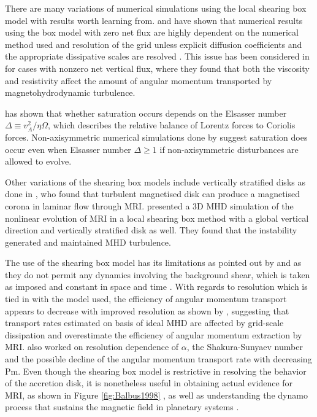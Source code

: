 \documentclass{jfm}
\begin{document}
There are many variations of numerical simulations using the local shearing box
model with results worth learning from. \cite{Fromang&Papaloizou2007} and
\cite{Fromang2007} have shown that numerical results using the box model with
zero net flux are highly dependent on the numerical method used and resolution
of the grid unless explicit diffusion coefficients and the appropriate
dissipative scales are resolved . This issue has been considered in
\cite{Lesur2007} for cases with nonzero net vertical flux, where they found
that both the viscosity and resistivity affect the amount of angular momentum
transported by magnetohydrodynamic turbulence. 

\cite{Sano1998} has shown that whether saturation occurs depends on the
Elsasser number $\Delta \equiv v^2_A/\eta \Omega$, which describes the relative
balance of Lorentz forces to Coriolis forces. Non-axisymmetric numerical
simulations done by \cite{Fleming2000} suggest saturation does occur even when
Elsasser number $  \Delta \ge 1$ if non-axisymmetric disturbances are allowed
to evolve. 

Other variations of the shearing box models include vertically stratified disks
as done in \cite{Miller1999}, who found that turbulent magnetised disk can
produce a magnetised corona in laminar flow through MRI. \cite{Stone1996}
presented a 3D MHD simulation of the nonlinear evolution of MRI in a local
shearing box method with a global vertical direction and vertically stratified
disk as well. They found that the instability generated and maintained MHD
turbulence.

The use of the shearing box model has its limitations as pointed out by
\cite{Hawley1995} and \cite{Regev2008} as they do not permit any dynamics
involving the background shear, which is taken as imposed and constant in space
and time \citep{Regev2008}. With regards to resolution which is tied in with
the model used, the efficiency of angular momentum transport appears to
decrease with improved resolution as shown by \cite{Fromang2007}, suggesting
that transport rates estimated on basis of ideal MHD are affected by grid-scale
dissipation and overestimate the efficiency of angular momentum extraction by
MRI.  \cite{Kapyla2011} also worked on resolution dependence of $\alpha$, the
Shakura-Sunyaev number and the possible decline of the angular momentum
transport rate with decreasing Pm. Even though the shearing box model is
restrictive in resolving the behavior of the accretion disk, it is nonetheless
useful in obtaining actual evidence for MRI, as shown in Figure
\ref{fig:Balbus1998} \citep{Balbus1998}, as well as understanding the dynamo
process that sustains the magnetic field in planetary systems \cite{Lesur2008}.
\end{document}
